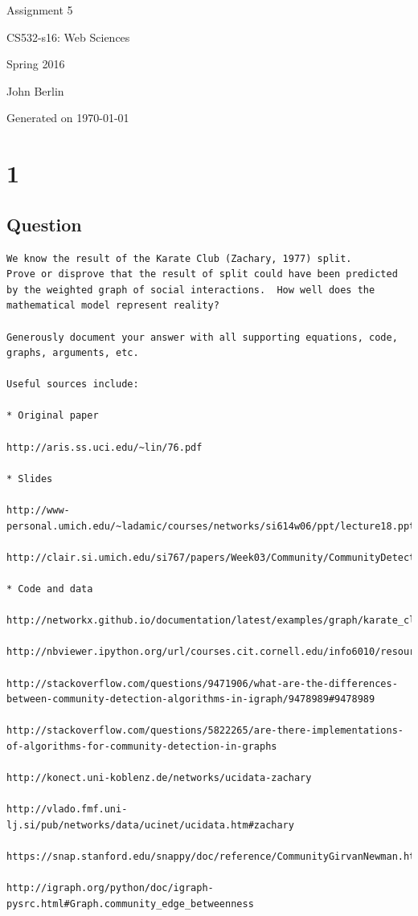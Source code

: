 \documentclass[letterpaper,10pt]{article}
\begin{document}
 

\begin{titlepage}

\begin{center}

\Huge{Assignment 5}

\Large{CS532-s16:  Web Sciences}

\Large{Spring 2016}

\Large{John Berlin}

\Large Generated on \today

\end{center}

\end{titlepage}
\newpage
\section*{1}
\subsection*{Question}
\begin{verbatim}
We know the result of the Karate Club (Zachary, 1977) split.
Prove or disprove that the result of split could have been predicted
by the weighted graph of social interactions.  How well does the
mathematical model represent reality?

Generously document your answer with all supporting equations, code,
graphs, arguments, etc.

Useful sources include:

* Original paper

http://aris.ss.uci.edu/~lin/76.pdf

* Slides

http://www-personal.umich.edu/~ladamic/courses/networks/si614w06/ppt/lecture18.ppt

http://clair.si.umich.edu/si767/papers/Week03/Community/CommunityDetection.pptx

* Code and data

http://networkx.github.io/documentation/latest/examples/graph/karate_club.html

http://nbviewer.ipython.org/url/courses.cit.cornell.edu/info6010/resources/11notes.ipynb

http://stackoverflow.com/questions/9471906/what-are-the-differences-between-community-detection-algorithms-in-igraph/9478989#9478989

http://stackoverflow.com/questions/5822265/are-there-implementations-of-algorithms-for-community-detection-in-graphs

http://konect.uni-koblenz.de/networks/ucidata-zachary

http://vlado.fmf.uni-lj.si/pub/networks/data/ucinet/ucidata.htm#zachary

https://snap.stanford.edu/snappy/doc/reference/CommunityGirvanNewman.html

http://igraph.org/python/doc/igraph-pysrc.html#Graph.community_edge_betweenness
\end{verbatim}
\newpage
\end{document}
